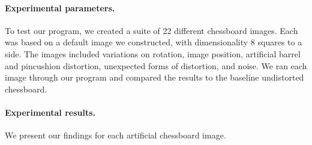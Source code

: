 \paragraph{Experimental parameters.}
To test our program, we created a suite of 22 different chessboard images. Each was based on a default image we constructed, with dimensionality 8 squares to a side. The images included variations on rotation, image position, artificial barrel and pincushion distortion, unexpected forms of distortion, and noise. We ran each image through our program and compared the results to the baseline undistorted chessboard.

\paragraph{Experimental results.}
We present our findings for each artificial chessboard image.

